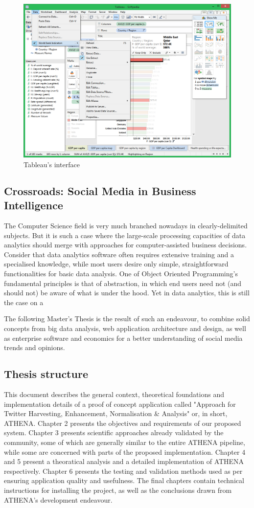 \begin{figure}[ht]
    \centering
\includegraphics[width=0.7\columnwidth]{img/Tableau-Desktop_3.png}
    \caption{Tableau's interface}
    \label{fig:tableau}
\end{figure}

\subsection{Crossroads: Social Media in Business Intelligence}

The Computer Science field is very much branched nowadays in clearly-delimited subjects. But it is such a case where the large-scale processing capacities of data analytics should merge with approaches for computer-assisted business decisions. Consider that data analytics software often requires extensive training and a specialised knowledge, while most users desire only simple, straightforward functionalities for basic data analysis. One of Object Oriented Programming's fundamental principles is that of abstraction, in which end users need not (and should not) be aware of what is under the hood. Yet in data analytics, this is still the case on a 

The following Master's Thesis is the result of such an endeavour, to combine solid concepts from big data analysis, web application architecture and design, as well as enterprise software and economics for a better understanding of social media trends and opinions.

\subsection*{Thesis structure}
This document describes the general context, theoretical foundations and implementation details of a proof of concept application called "Approach for Twitter Harvesting, Enhancement, Normalisation \& Analysis" or, in short, ATHENA. Chapter 2 presents the objectives and requirements of our proposed system. Chapter 3 presents scientific approaches already validated by the community, some of which are generally similar to the entire ATHENA pipeline, while some are concerned with parts of the proposed implementation. Chapter 4 and 5 present a theoratical analysis and a detailed implementation of ATHENA respectively. Chapter 6 presents the testing and validation methods used as per ensuring application quality and usefulness. The final chapters contain technical instructions for installing the project, as well as the conclusions drawn from ATHENA's development endeavour.